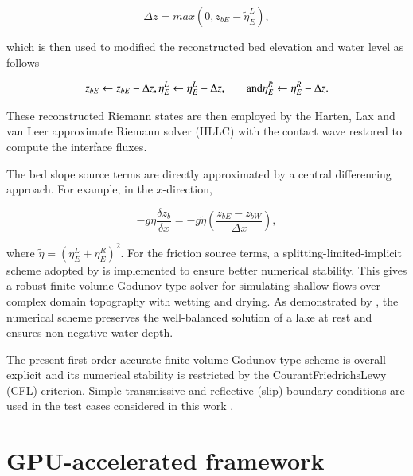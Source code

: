 \documentclass[11pt,english,a4paper]{article}
\begin{document}
\begin{equation}
	\label{SWE_1stO_BedShift}
	\Delta z = max \left ( 0, z_{bE} - \tilde{\eta}_{E}^{L} \right )
	,
\end{equation}

which is then used to modified the reconstructed bed elevation and water level as follows

\begin{equation}
	\label{SWE_1stO_ShiftedStates}
	z_{bE} \leftarrow z_{bE} - \Delta z, \\
	\eta_{E}^{L} \leftarrow \eta_{E}^{L} - \Delta z,
	\hspace{4ex} \textrm{and} \hspace{4ex}	\\
	\eta_{E}^{R} \leftarrow \eta_{E}^{R} - \Delta z
	.
\end{equation}

These reconstructed Riemann states are then employed by the Harten, Lax and van Leer approximate Riemann solver (HLLC) with the contact wave restored \citep{Toro1994} to compute the interface fluxes.

The bed slope source terms are directly approximated by a central differencing approach. For example, in the $x$-direction,

\begin{equation}
	\label{SWE_1stO_BedSlope}
	-g \eta \frac{ \delta z_b }{ \delta x } = -g \tilde{\eta} \left ( \frac{ z_{bE} - z_{bW} }{ \Delta x } \right )
	,
\end{equation}

where $ \tilde{\eta} = ( \eta_{E}^{L} + \eta_{E}^{R} )^2 $. For the friction source terms, a splitting-limited-implicit scheme adopted by \citet{Liang2010a} is implemented to ensure better numerical stability. This gives a robust finite-volume Godunov-type solver for simulating shallow flows over complex domain topography with wetting and drying. As demonstrated by \citet{Liang2010a}, the numerical scheme preserves the well-balanced solution of a lake at rest and ensures non-negative water depth.

The present first-order accurate finite-volume Godunov-type scheme is overall explicit and its numerical stability is restricted by the Courant\textendash Friedrichs\textendash Lewy (CFL) criterion. Simple transmissive and reflective (slip) boundary conditions are used in the test cases considered in this work \citep{Liang2010a}.

\section{GPU-accelerated framework}
\end{document}
